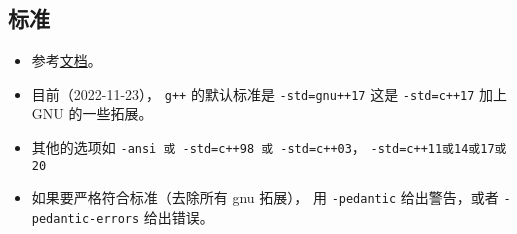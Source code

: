 \subsection{标准}
\begin{itemize}
\item 参考\href{https://gcc.gnu.org/onlinedocs/gcc/Standards.html}{文档}。
\item 目前（2022-11-23）， \verb|g++| 的默认标准是 \verb|-std=gnu++17| 这是 \verb|-std=c++17| 加上 GNU 的一些拓展。
\item 其他的选项如 \verb|-ansi 或 -std=c++98 或 -std=c++03|， \verb|-std=c++11或14或17或20|
\item 如果要严格符合标准（去除所有 gnu 拓展）， 用 \verb|-pedantic| 给出警告，或者 \verb|-pedantic-errors| 给出错误。
\end{itemize}
